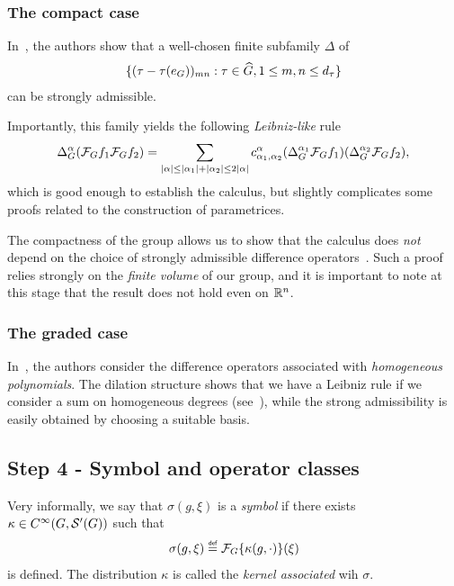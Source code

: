 \subsubsection*{The compact case}

In~\cite{RuzhanskyTurunenWirth10},
the authors show that a well-chosen finite subfamily $\Delta$ of
\begin{align*}
    \{(\tau - \tau(e_G))_{m n} : \tau \in {\widehat{G}}, 1 \leq m, n \leq {d_{\tau}}\}
\end{align*}
can be strongly admissible.

Importantly,
this family yields the following \emph{Leibniz-like} rule
\begin{align*}
    {\Delta_{G}^{\alpha}} (\mathcal{F}_{G} f_1 \mathcal{F}_{G} f_2)
    = \sum_{\left|{\alpha}\right| \leq \left|{\alpha_1}\right| + \left|{\alpha_2}\right| \leq 2 \left|{\alpha}\right|}
    c^\alpha_{\alpha_1, \alpha_2}
    ({\Delta_{G}^{\alpha_1}} \mathcal{F}_{G} f_1)
    ({\Delta_{G}^{\alpha_2}} \mathcal{F}_{G} f_2),
\end{align*}
which is good enough to establish the calculus,
but slightly complicates some proofs related to the construction of parametrices.

The compactness of the group allows us to show that the calculus does \emph{not} depend on the choice of strongly admissible difference operators~\cite{RuzhanskyTurunenWirth10,Fischer2015}.
Such a proof relies strongly on the \emph{finite volume} of our group,
and it is important to note at this stage that the result does not hold even on $\mathbb{R}^n$.

\subsubsection*{The graded case}

In~\cite{FischerRuzhansky16},
the authors consider the difference operators associated with \emph{homogeneous polynomials}.
The dilation structure
shows that we have a Leibniz rule if we consider a sum on homogeneous degrees
(see~\cite[Subsection 5.2.1]{FischerRuzhansky16}),
while the strong admissibility is easily obtained by choosing a suitable basis.

\subsection*{Step 4 - Symbol and operator classes}

Very informally,
we say that $\sigma(g, \xi)$ is a \emph{symbol} if there exists $\kappa \in {C^\infty(G, {\mathcal{S}' (G)})}$ such that
\begin{align*}
    \sigma(g, \xi) \defeq \Fourier \{\kappa(g, \dummy)\}(\xi)
\end{align*}
is defined.
The distribution $\kappa$ is called the \emph{kernel associated} wih $\sigma$.

